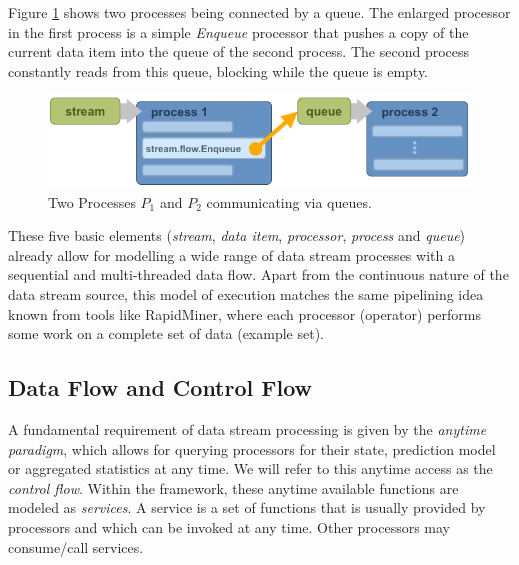 Figure \ref{fig:queues} shows two processes being connected by a
queue. The enlarged processor in the first process is a simple {\em
  Enqueue} processor that pushes a copy of the current data item into
the queue of the second process. The second process constantly reads
from this queue, blocking while the queue is empty.

\begin{figure}[h!]
  \begin{center}
    \includegraphics[scale=0.5]{graphics/process-queues.png}
  \end{center}
  \caption{\label{fig:queues}Two Processes $P_1$ and $P_2$ communicating via queues.}
\end{figure}

\bigskip

These five basic elements ({\em stream}, {\em data item}, {\em
  processor}, {\em process} and {\em queue}) already allow for
modelling a wide range of data stream processes with a sequential and
multi-threaded data flow.
Apart from the continuous nature of the data stream source, this model
of execution matches the same pipelining idea known from tools like
RapidMiner, where each processor (operator) performs some work on a
complete set of data (example set).

\subsection{Data Flow and Control Flow}
A fundamental requirement of data stream processing is given by the
{\em anytime paradigm}, which allows for querying processors for their
state, prediction model or aggregated statistics at any time. We will
refer to this anytime access as the {\em control flow}.  Within the
\streams framework, these anytime available functions are modeled as {\em
  services}. A service is a set of functions that is usually provided
by processors and which can be invoked at any time. Other processors
may consume/call services. 

